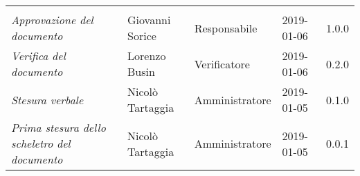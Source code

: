 \newpage 
\section*{}
\begin{table}[H]
	\centering
	\begin{tabular}{p{4cm}|C{3cm}|C{3cm}|R{2.5cm}|R{2cm}}
		
		 & & & & \\
		
		
		\emph{Approvazione del documento} &  Giovanni Sorice & Responsabile & 2019-01-06 & 1.0.0 \\
		\hline
		
		\emph{Verifica del documento} & Lorenzo Busin & Verificatore & 2019-01-06 & 0.2.0 \\
		\hline

		\emph{Stesura verbale} & Nicolò Tartaggia & Amministratore & 2019-01-05 & 0.1.0 \\
		\hline
		
		\emph{Prima stesura dello scheletro del documento} & Nicolò Tartaggia & Amministratore & 2019-01-05 & 0.0.1 \\
		
	\end{tabular}
	
\end{table}


\clearpage